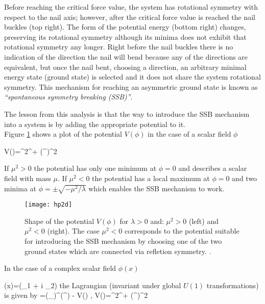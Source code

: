 \noindent Before reaching the critical force value, the system has rotational symmetry with respect to the nail axis; however, after the critical force value is reached the nail buckles (top right). The form of the potential energy (bottom right) changes, preserving its rotational symmetry although its minima does not exhibit that rotational symmetry any longer. Right before the nail buckles there is no indication of the direction the nail will bend because any of the directions are equivalent, but once the nail bent, choosing a direction, an arbitrary minimal energy state (ground state) is selected and it does not share the system rotational symmetry. This mechanism for reaching an asymmetric ground state is known as \textit{``spontaneous symmetry breaking (SSB)''}.       

\noindent The lesson from this analysis is that the way to introduce the SSB mechanism into a system is by adding the appropriate potential to it.\\ 

\noindent Figure \ref{hp2d} shows a plot of the potential $V(\phi)$ in the case of a scalar field $\phi$

\beqn\label{Higgs_potential}
V(\phi)=\mu^2\phi^\dagger\phi + \lambda(\phi^\dagger\phi)^2
\eeqn

\noindent If $\mu^2>0$ the potential has only one minimum at $\phi=0$ and describes a scalar field with mass $\mu$. If $\mu^2<0$ the potential has a local maximum at $\phi=0$ and two minima at $\phi=\pm \sqrt{-\mu^2/\lambda}$ which enables the SSB mechanism to work. 

\begin{figure}[!h]
\centering
\texttt{[image: hp2d]}
\caption[SSB Potential form]{Shape of the potential $V(\phi)$ for $\lambda>0$ and: $\mu^2>0$ (left) and $\mu^2<0$ (right). The case $\mu^2<0$ corresponds to the potential suitable for introducing the SSB mechanism by choosing one of the two ground states which are connected via refletion symmetry. \cite{broken_symmetry}.}
\label{hp2d}
\end{figure}

\noindent In the case of a complex scalar field $\phi(x)$

\beqn\label{complex_scalar}
\phi(x)=(\phi_1 + i \phi_2)
\eeqn
\noindent the Lagrangian (invariant under global $U(1)$ transformations) is given by 
\beqn\label{higgs_potential}
\Lagr=(\partial_\mu\phi)^\dagger(\partial^\mu\phi) - V(\phi) , \qquad V(\phi)=\mu^2\phi^\dagger\phi + \lambda(\phi^\dagger\phi)^2
\eeqn

